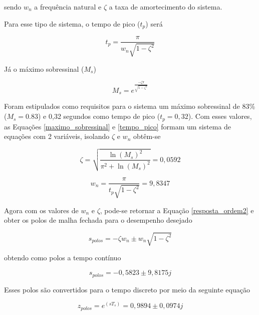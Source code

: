 \noindent sendo $w_n$ a frequência natural e $\zeta$ a taxa de amortecimento do sistema.

Para esse tipo de sistema, o tempo de pico ($t_p$) será

\begin{equation}
    t_p=\frac{\pi}{w_n \sqrt{1-\zeta^2}}
    \label{tempo_pico}
\end{equation}

Já o máximo sobressinal ($M_s$)

\begin{equation}
    M_s=e^\frac{-\zeta \pi}{\sqrt{1-\zeta^2}}
    \label{maximo_sobressinal}
\end{equation}

Foram estipulados como requisitos para o sistema um máximo sobressinal de 83\% ($M_s=0.83$) e 0,32 segundos como tempo de pico ($t_p=0,32$). Com esses valores, as Equações \ref{maximo_sobressinal} e \ref{tempo_pico} formam um sistema de equações com 2 variáveis, isolando $\zeta$ e $w_n$ obtêm-se

\begin{equation}
    \zeta = \sqrt{\frac{\ln(M_s)^2}{\pi^2+\ln(M_s)^2}} =  0,0592
    \label{zeta}
\end{equation}

\begin{equation}
    w_n = \frac{\pi}{t_p \sqrt{1-\zeta^2}} = 9,8347
    \label{wn}
\end{equation}

Agora com os valores de $w_n$ e $\zeta$, pode-se retornar a Equação \ref{resposta_ordem2} e obter os polos de malha fechada para o desempenho desejado

\begin{equation}
    s_{polos} = -\zeta w_n \pm w_n \sqrt{1-\zeta^2}
    \label{polos_malha_fechada}
\end{equation}

\noindent obtendo como polos a tempo contínuo

\begin{equation}
    s_{polos} = -0,5823 \pm 9,8175 j
    \label{polos_continuo}
\end{equation}

Esses polos são convertidos para o tempo discreto por meio da seguinte equação

\begin{equation}
    z_{polos} = e^{(s T_s)} = 0,9894 \pm 0,0974 j
    \label{polos_discreto}
\end{equation}

